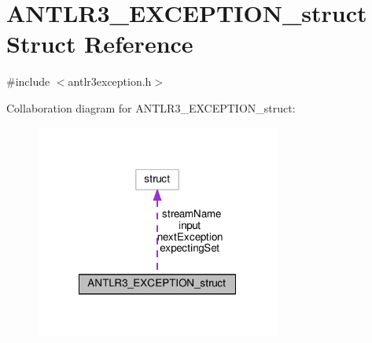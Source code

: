 \hypertarget{struct_a_n_t_l_r3___e_x_c_e_p_t_i_o_n__struct}{\section{A\-N\-T\-L\-R3\-\_\-\-E\-X\-C\-E\-P\-T\-I\-O\-N\-\_\-struct Struct Reference}
\label{struct_a_n_t_l_r3___e_x_c_e_p_t_i_o_n__struct}
}


{\ttfamily \#include $<$antlr3exception.\-h$>$}



Collaboration diagram for A\-N\-T\-L\-R3\-\_\-\-E\-X\-C\-E\-P\-T\-I\-O\-N\-\_\-struct\-:
\nopagebreak
\begin{figure}[H]
\begin{center}
\leavevmode
\includegraphics[width=228pt]{struct_a_n_t_l_r3___e_x_c_e_p_t_i_o_n__struct__coll__graph}
\end{center}
\end{figure}
